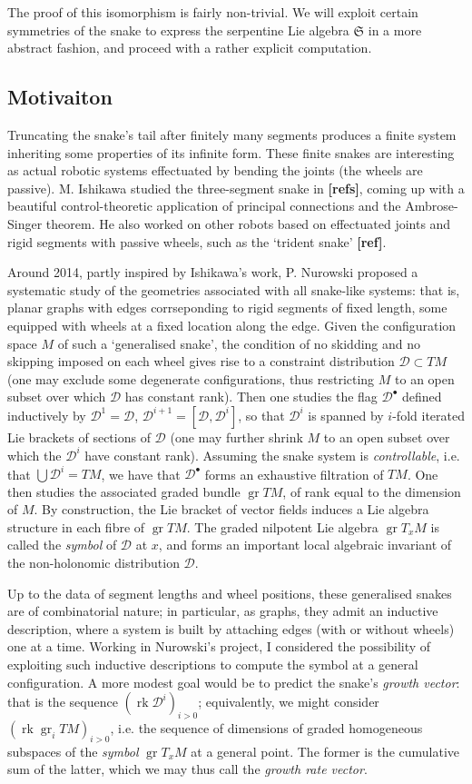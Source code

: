\documentclass{article}
\def\fS{\mathfrak{S}}
\def\sD{\mathcal{D}}
\DeclareMathOperator{\gr}{\mathrm{gr}}
\DeclareMathOperator{\rk}{\mathrm{rk}}
\theoremstyle{definition}
\begin{document}
The proof of this isomorphism is fairly non-trivial. We will exploit certain symmetries
of the snake to express the serpentine Lie algebra $\fS$ in a more abstract fashion,
and proceed with a rather explicit computation. 

\subsection{Motivaiton}
Truncating the snake's tail after finitely many segments
produces a finite system inheriting some properties of 
its infinite form. 
These finite snakes are interesting as actual
robotic systems effectuated by bending the joints (the wheels are passive). 
M. Ishikawa studied the three-segment snake in \textbf{[refs]},
coming up with a beautiful control-theoretic application of
principal connections and the Ambrose-Singer theorem. He also worked on other robots based on
effectuated joints and rigid segments with passive wheels, such as
the `trident snake' \textbf{[ref]}.

Around 2014, partly inspired by Ishikawa's work, P. Nurowski proposed 
a systematic study of the geometries associated with all snake-like systems: 
that is, planar graphs with edges corrseponding to rigid segments of fixed
length, some equipped with wheels at a fixed location along the edge. 
Given the configuration space $M$ of such a `generalised snake', 
the condition of no skidding and no skipping imposed on each wheel
gives rise to a constraint distribution $\sD \subset TM$ (one may 
exclude some degenerate configurations, thus restricting $M$ to an 
open subset over which $\sD$ has constant rank). Then one studies
the flag $\sD^\bullet$ defined inductively by $\sD^1 = \sD$,
$\sD^{i+1}=[\sD,\sD^i]$, so that $\sD^{i}$
is spanned by $i$-fold iterated Lie brackets of sections of $\sD$
(one may further shrink $M$ to an open subset over which
the $\sD^i$ have constant rank). Assuming the snake system is \emph{controllable},
i.e. that $\bigcup \sD^i=TM$, we have that $\sD^\bullet$
forms an exhaustive filtration of $TM$. One then studies the associated graded
bundle $\gr TM$, of rank equal to the dimension of $M$. By construction, the Lie
bracket of vector fields induces a Lie algebra structure in each fibre of $\gr TM$.
The graded nilpotent Lie algebra $\gr T_x M$ is called the \emph{symbol} of $\sD$ at $x$, and forms
an important local algebraic invariant of the non-holonomic distribution $\sD$.

Up to the data of segment lengths and wheel positions, these generalised snakes
are of combinatorial nature; in particular, as graphs, they admit an inductive
description, where a system is built by attaching edges (with or without wheels)
one at a time. Working in Nurowski's project, I considered the possibility of exploiting
such inductive descriptions to compute the symbol at a general configuration.
A more modest goal would be to predict the snake's \emph{growth vector}: that is
the sequence $(\rk\sD^i)_{i>0}$; equivalently, we might consider
$(\rk \gr_iTM)_{i>0}$, i.e. 
the sequence of dimensions
of graded homogeneous subspaces of the \emph{symbol} $\gr T_x M$ at a general point.
The former is the cumulative sum of the latter, which we may thus call the
\emph{growth rate vector}.
\end{document}
